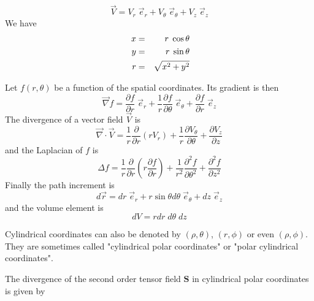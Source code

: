 \[
{\vec V} 
= V_r \; \vec{e}_r  + V_\theta \; \vec{e}_\theta + V_z \; \vec{e}_z
\]
We have 
\begin{eqnarray}
x &=& r \; \cos\theta \nn\\
y &=& r \; \sin \theta \nn\\\ 
r &=& \sqrt{x^2+y^2} \nn
\end{eqnarray}

Let $f(r,\theta)$ be a function of the spatial coordinates. Its gradient is then
\[
\vec \nabla f
= \frac{\partial f}{\partial r} \; \vec{e}_r 
+ \frac{1}{r} \frac{\partial f}{\partial \theta} \; \vec{e}_\theta
+ \frac{\partial f}{\partial r} \; \vec{e}_z
\]
The divergence of a vector field $\vec{V}$ is 
\[
\vec\nabla \cdot \vec{V} 
= \frac{1}{r} \frac{\partial }{\partial r} (r V_r) 
+ \frac{1}{r} \frac{\partial V_\theta}{\partial \theta} 
+ \frac{\partial V_z}{\partial z}
\]
and the Laplacian of $f$ is
\[
\Delta f = \frac{1}{r} \frac{\partial }{\partial r} \left( r \frac{\partial f}{\partial r} \right)
+ \frac{1}{r^2} \frac{\partial^2 f}{\partial \theta^2} 
+ \frac{\partial^2 f}{\partial z^2} 
\]
Finally the path increment is
\[
d\vec{r} = dr \; {\vec e}_r  + r \sin\theta d\theta \; {\vec e}_\theta + dz \; \vec{e}_z
\]
and the volume element is 
\[
dV= r dr \; d\theta \; dz
\]

\begin{remark} 
Cylindrical coordinates can also be denoted by $(\rho,\theta)$, $(r,\phi)$ or even $(\rho,\phi)$.
They are sometimes called "cylindrical polar coordinates" or "polar cylindrical coordinates".
\end{remark}


The divergence of the second order tensor field ${\bm S}$ in cylindrical polar coordinates is given 
by

